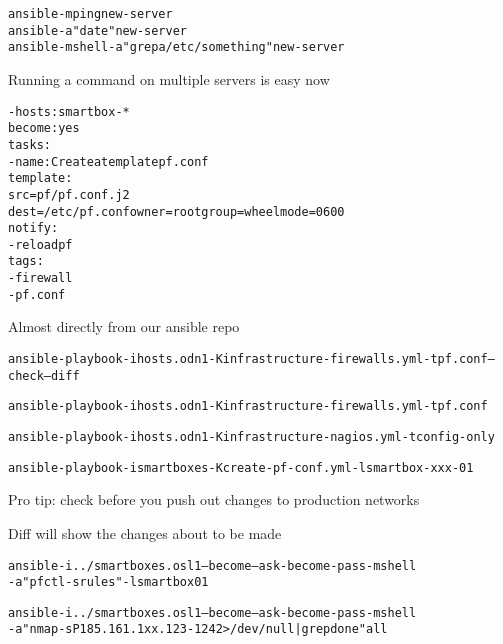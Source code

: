 \documentclass[18pt,landscape,a4paper,footrule]{foils}
\begin{document}

\begin{alltt}\footnotesize
  ansible -m ping new-server
  ansible -a "date" new-server
  ansible -m shell -a "grep a /etc/something" new-server
\end{alltt}

\begin{list2}
\item Running a command on multiple servers is easy now
\end{list2}



\begin{alltt}\footnotesize
  - hosts: smartbox-*
    become: yes
    tasks:
    - name: Create a template pf.conf
      template:
        src=pf/pf.conf.j2
        dest=/etc/pf.conf owner=root group=wheel mode=0600
     notify:
        - reload pf
      tags:
        - firewall
        - pf.conf
\end{alltt}

\begin{list2}
\item Almost directly from our ansible repo
\end{list2}


\begin{alltt}\footnotesize
ansible-playbook -i hosts.odn1 -K infrastructure-firewalls.yml -t pf.conf --check --diff

ansible-playbook -i hosts.odn1 -K infrastructure-firewalls.yml -t pf.conf

ansible-playbook -i hosts.odn1 -K infrastructure-nagios.yml -t config-only

ansible-playbook -i smartboxes -K create-pf-conf.yml -l smartbox-xxx-01
\end{alltt}

\begin{list2}
\item Pro tip: check before you push out changes to production networks \smiley
\item Diff will show the changes about to be made
\end{list2}


\begin{alltt}\footnotesize
ansible -i ../smartboxes.osl1 --become --ask-become-pass -m shell
-a "pfctl -s rules" -l smartbox01

ansible -i ../smartboxes.osl1 --become --ask-become-pass -m shell
-a "nmap -sP 185.161.1xx.123-124 2> /dev/null| grep done" all
\end{alltt}
\end{document}
